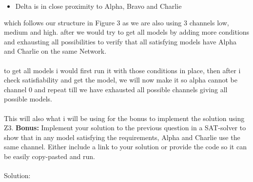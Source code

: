 \documentclass{article}
\newcommand*\moveToRight[1]{\hspace*{0em plus 1fill}\makebox{(#1)}}
\begin{document}
\begin{enumerate}[(a)]
\begin{itemize}
            \item Delta is in close proximity to Alpha, Bravo and Charlie
        \end{itemize}
        which follows our structure in Figure 3 as we are also using 3 channels low, medium and high. 
        after we would try to get all models by adding more conditions and exhausting all possibilities to verify that all satisfying models have Alpha and Charlie on the same Network.\\\\ to get all models i would first run it with those conditions in place, then after i check satisfiability and get the model, we will now make it so alpha cannot be channel 0 and repeat till we have exhausted all possible channels giving all possible models. \\\\ This will also what i will be using for the bonus to implement the solution using Z3.
        \newpage
        \textbf{Bonus:} Implement your solution to the previous question in a SAT-solver to show that in any model satisfying the requirements, Alpha and Charlie use the same channel. Either include a link to your solution or provide the code so it can be easily copy-pasted and run. \moveToRight{10* marks}\\\\
        Solution:\\
        
\end{enumerate}
\end{document}
